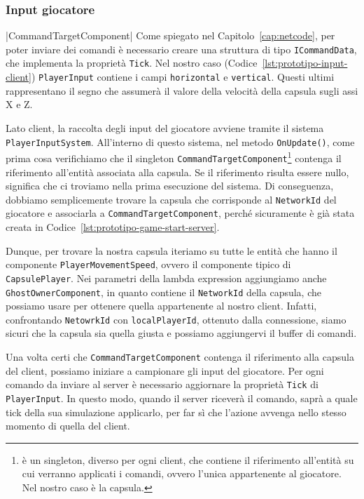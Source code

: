 \subsubsection{Input giocatore}

|CommandTargetComponent|
Come spiegato nel Capitolo~\ref{cap:netcode}, per poter inviare dei comandi è necessario creare una struttura di tipo \verb|ICommandData|, che implementa la proprietà \verb|Tick|. Nel nostro caso (Codice~\ref{lst:prototipo-input-client}) \verb|PlayerInput| contiene i campi \verb|horizontal| e \verb|vertical|. Questi ultimi rappresentano il segno che assumerà il valore della velocità della capsula sugli assi X e Z.

Lato client, la raccolta degli input del giocatore avviene tramite il sistema \verb|PlayerInputSystem|. All'interno di questo sistema, nel metodo \verb|OnUpdate()|, come prima cosa verifichiamo che il singleton \verb|CommandTargetComponent|\footnote{ è un singleton, diverso per ogni client, che contiene il riferimento all'entità su cui verranno applicati i comandi, ovvero l'unica appartenente al giocatore. Nel nostro caso è la capsula.} contenga il riferimento all'entità associata alla capsula. 
Se il riferimento risulta essere nullo, significa che ci troviamo nella prima esecuzione del sistema. Di conseguenza, dobbiamo semplicemente trovare la capsula che corrisponde al \verb|NetworkId| del giocatore e associarla a \verb|CommandTargetComponent|, perché sicuramente è già stata creata in Codice~\ref{lst:prototipo-game-start-server}.

Dunque, per trovare la nostra capsula iteriamo su tutte le entità che hanno il componente \verb|PlayerMovementSpeed|, ovvero il componente tipico di \verb|CapsulePlayer|. Nei parametri della lambda expression aggiungiamo anche \verb|GhostOwnerComponent|, in quanto contiene il \verb|NetworkId| della capsula, che possiamo usare per ottenere quella appartenente al nostro client. Infatti, confrontando \verb|NetowrkId| con \verb|localPlayerId|, ottenuto dalla connessione, siamo sicuri che la capsula sia quella giusta e possiamo aggiungervi il buffer di comandi.

Una volta certi che \verb|CommandTargetComponent| contenga il riferimento alla capsula del client, possiamo iniziare a campionare gli input del giocatore. Per ogni comando da inviare al server è necessario aggiornare la proprietà \verb|Tick| di \verb|PlayerInput|. In questo modo, quando il server riceverà il comando, saprà a quale tick della sua simulazione applicarlo, per far sì che l'azione avvenga nello stesso momento di quella del client.\\


